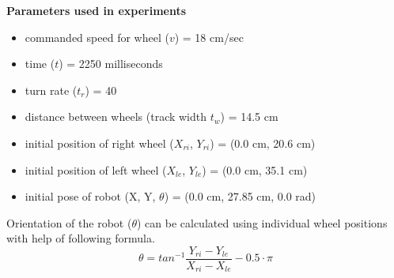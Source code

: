 \par
\textbf{Parameters used in experiments}
\begin{itemize}
	\item commanded speed for wheel ($v$) = 18 cm/sec
	\item time ($t$) = 2250 milliseconds
	\item turn rate ($t_r$) = 40 
	\item distance between wheels (track width $t_w$) = 14.5 cm 
	\item initial position of right wheel ($X_{ri}$, $Y_{ri}$) = (0.0 cm, 20.6 cm) 
	\item initial position of left wheel ($X_{le}$, $Y_{le}$) = (0.0 cm, 35.1 cm)
	\item initial pose of robot (X, Y, $\theta$) = (0.0 cm, 27.85 cm, 0.0 rad)
\end{itemize}
\par Orientation of the robot ($\theta$) can be calculated using individual wheel positions with help of following formula. 
$$\theta = tan^{-1}\frac{Y_{ri} - Y_{le}}{X_{ri} - X_{le}} - 0.5\cdot{\pi}$$
